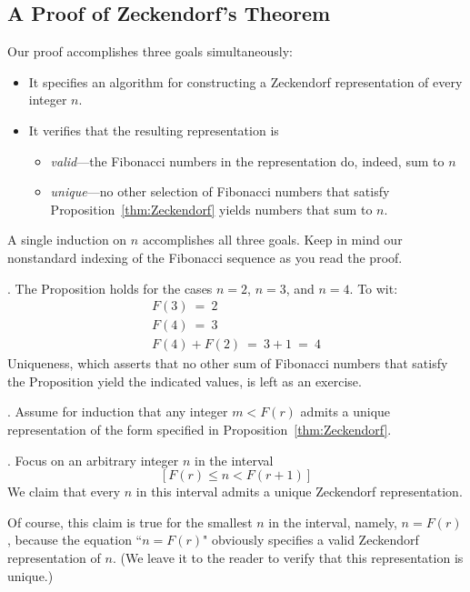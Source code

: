 \subsection{A Proof of Zeckendorf's Theorem}
\label{sec:Zeckendorf-proof}

Our proof accomplishes three goals simultaneously:
\begin{itemize}
\item
It specifies an algorithm for constructing a Zeckendorf representation of every integer $n$.
\item
It verifies that the resulting representation is
  \begin{itemize}
  \item
{\em valid}---the Fibonacci numbers in the representation do, indeed, sum to $n$
  \item
{\em unique}---no other selection of Fibonacci numbers that satisfy Proposition~\ref{thm:Zeckendorf} yields numbers that sum to $n$.
  \end{itemize}
\end{itemize}
A single induction on $n$ accomplishes all three goals.  Keep in mind our nonstandard indexing of the Fibonacci sequence as you read the proof.

\medskip

.
The Proposition holds for the cases $n=2$, $n=3$, and $n=4$.  To wit:
\[ \begin{array}{l}
F(3) \ = \ 2 \\
F(4) \ = \ 3 \\
F(4) + F(2) \ = \ 3 + 1 \ = \ 4
\end{array}
\]
Uniqueness, which asserts that no other sum of Fibonacci numbers that satisfy the Proposition yield the indicated values, is left as an exercise.

\medskip

.
Assume for induction that any integer $m < F(r)$ admits a unique representation of the form specified in Proposition~\ref{thm:Zeckendorf}.

\medskip

.
Focus on an arbitrary integer $n$ in the interval
\[ [F(r) \leq n < F(r+1)] \]
We claim that every $n$ in this interval admits a unique Zeckendorf representation.

\smallskip

Of course, this claim is true for the smallest $n$ in the interval, namely, $n=F(r)$, because the equation ``$n=F(r)$" obviously specifies a valid Zeckendorf representation of $n$.  (We leave it to the reader to verify that this representation is unique.)

